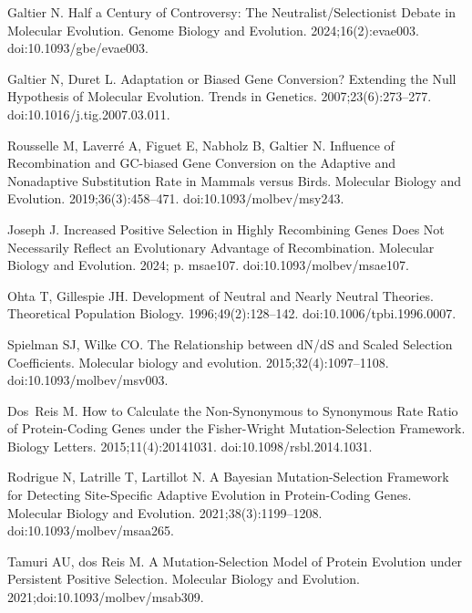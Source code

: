 \documentclass[10pt,letterpaper]{article}
\begin{document}
\begin{thebibliography}{10}
Galtier N.
\newblock Half a {{Century}} of {{Controversy}}: {{The
Neutralist}}/{{Selectionist Debate}} in {{Molecular Evolution}}.
\newblock Genome Biology and Evolution. 2024;16(2):evae003.
\newblock doi:{10.1093/gbe/evae003}.

Galtier N, Duret L.
\newblock Adaptation or Biased Gene Conversion? {{Extending}} the Null
Hypothesis of Molecular Evolution.
\newblock Trends in Genetics. 2007;23(6):273--277.
\newblock doi:{10.1016/j.tig.2007.03.011}.

Rousselle M, Laverr{\'e} A, Figuet E, Nabholz B, Galtier N.
\newblock Influence of {{Recombination}} and {{GC-biased Gene Conversion}} on
the {{Adaptive}} and {{Nonadaptive Substitution Rate}} in {{Mammals}} versus
{{Birds}}.
\newblock Molecular Biology and Evolution. 2019;36(3):458--471.
\newblock doi:{10.1093/molbev/msy243}.

Joseph J.
\newblock Increased {{Positive Selection}} in {{Highly Recombining Genes Does}}
Not {{Necessarily Reflect}} an {{Evolutionary Advantage}} of
{{Recombination}}.
\newblock Molecular Biology and Evolution. 2024; p. msae107.
\newblock doi:{10.1093/molbev/msae107}.

Ohta T, Gillespie JH.
\newblock Development of {{Neutral}} and {{Nearly Neutral Theories}}.
\newblock Theoretical Population Biology. 1996;49(2):128--142.
\newblock doi:{10.1006/tpbi.1996.0007}.

Spielman SJ, Wilke CO.
\newblock The Relationship between {{dN}}/{{dS}} and Scaled Selection
Coefficients.
\newblock Molecular biology and evolution. 2015;32(4):1097--1108.
\newblock doi:{10.1093/molbev/msv003}.

Dos~Reis M.
\newblock How to Calculate the Non-Synonymous to Synonymous Rate Ratio of
Protein-Coding Genes under the Fisher-Wright Mutation-Selection Framework.
\newblock Biology Letters. 2015;11(4):20141031.
\newblock doi:{10.1098/rsbl.2014.1031}.

Rodrigue N, Latrille T, Lartillot N.
\newblock A {{Bayesian}} Mutation-Selection Framework for Detecting
Site-Specific Adaptive Evolution in Protein-Coding Genes.
\newblock Molecular Biology and Evolution. 2021;38(3):1199--1208.
\newblock doi:{10.1093/molbev/msaa265}.

Tamuri AU, {dos Reis} M.
\newblock A Mutation-Selection Model of Protein Evolution under Persistent
Positive Selection.
\newblock Molecular Biology and Evolution. 2021;doi:{10.1093/molbev/msab309}.


\end{thebibliography}
\end{document}

